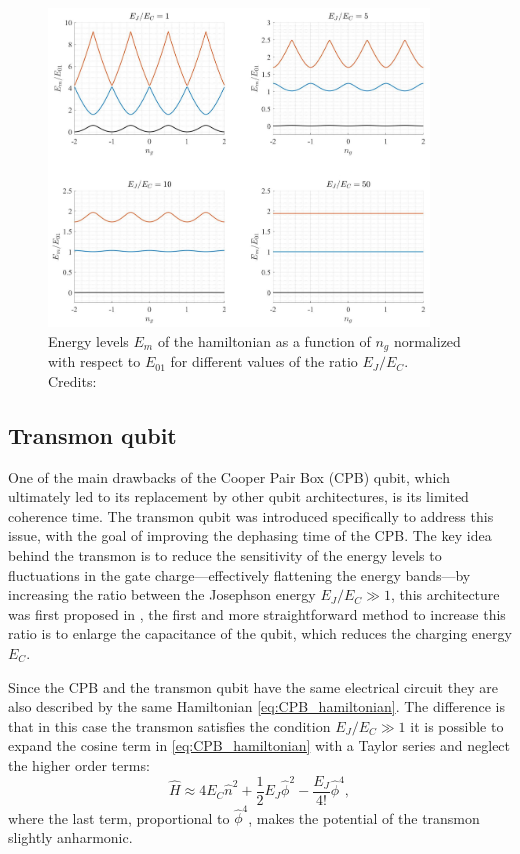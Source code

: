 \begin{figure}[h!]
    \centering
    \includegraphics[width=0.9\textwidth]{figures/png/energy_levels.png}
    \caption{Energy levels $E_m$ of the hamiltonian as a function of $n_g$ normalized with respect to $E_{01}$ for different values of the ratio $E_J/E_C$. \\ Credits: \cite{Roth_2023}}
    \label{fig:energy_levels}
\end{figure}


\subsection{Transmon qubit}
One of the main drawbacks of the Cooper Pair Box (CPB) qubit, which ultimately led to its replacement by other qubit architectures, is its limited coherence time. 
The transmon qubit was introduced specifically to address this issue, with the goal of improving the dephasing time of the CPB. The key idea behind the transmon is to reduce the sensitivity of the energy levels to fluctuations in the gate charge—effectively flattening the energy bands—by increasing the ratio between the Josephson energy $E_J/E_C \gg 1$,
this architecture was first proposed in \cite{TransmonPaper}, the first and more straightforward method to increase this ratio is to enlarge the capacitance of the qubit, which reduces the charging energy $E_C$.

Since the CPB and the transmon qubit have the same electrical circuit they are also described by the same Hamiltonian \ref{eq:CPB_hamiltonian}. 
The difference is that in this case the transmon satisfies the condition $E_J/E_C \gg 1$ it is possible to expand the cosine term in \ref{eq:CPB_hamiltonian} with a Taylor series and neglect the higher order terms:
\begin{equation}\label{eq:approx_transmon}
    \hat{H}\approx 4E_C\hat{n}^2 + \frac{1}{2}E_J\hat{\phi}^2 - \frac{E_J}{4!}\hat{\phi}^4,
\end{equation}
where the last term, proportional to $\hat{\phi}^4$, makes the potential of the transmon slightly anharmonic.

